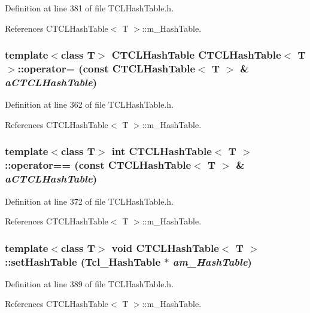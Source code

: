 Definition at line 381 of file TCLHash\-Table.h.

References CTCLHash\-Table$<$ T $>$::m\_\-Hash\-Table.
\subsubsection{\setlength{\rightskip}{0pt plus 5cm}template$<$class T$>$ CTCLHash\-Table CTCLHash\-Table$<$ T $>$::operator= (const CTCLHash\-Table$<$ T $>$ \& {\em a\-CTCLHash\-Table})\hspace{0.3cm}{\tt  [inline]}}\label{classCTCLHashTable_a4}




Definition at line 362 of file TCLHash\-Table.h.

References CTCLHash\-Table$<$ T $>$::m\_\-Hash\-Table.
\subsubsection{\setlength{\rightskip}{0pt plus 5cm}template$<$class T$>$ int CTCLHash\-Table$<$ T $>$::operator== (const CTCLHash\-Table$<$ T $>$ \& {\em a\-CTCLHash\-Table})\hspace{0.3cm}{\tt  [inline]}}\label{classCTCLHashTable_a5}




Definition at line 372 of file TCLHash\-Table.h.

References CTCLHash\-Table$<$ T $>$::m\_\-Hash\-Table.
\subsubsection{\setlength{\rightskip}{0pt plus 5cm}template$<$class T$>$ void CTCLHash\-Table$<$ T $>$::set\-Hash\-Table (Tcl\_\-Hash\-Table $\ast$ {\em am\_\-Hash\-Table})\hspace{0.3cm}{\tt  [inline, protected]}}\label{classCTCLHashTable_b0}




Definition at line 389 of file TCLHash\-Table.h.

References CTCLHash\-Table$<$ T $>$::m\_\-Hash\-Table.
